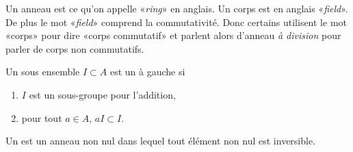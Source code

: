 \begin{remark}
    Un anneau est ce qu'on appelle «\emph{ring}» en anglais. Un corps est en anglais «\emph{field}». De plus le mot «\emph{field}» comprend la commutativité. Donc certains utilisent le mot «corps» pour dire «corps commutatif» et parlent alors d'anneau \emph{à division} pour parler de corps non commutatifs.
\end{remark}

\begin{definition}  \label{DefooQULAooREUIU}
    Un sous ensemble \( I\subset A\) est un  à gauche si
    \begin{enumerate}
        \item
            \( I\) est un sous-groupe pour l'addition,
        \item
            pour tout \( a\in A\), \( aI\subset I\).
    \end{enumerate}
\end{definition}

\begin{definition}  \label{DefTMNooKXHUd}
    Un  est un anneau non nul dans lequel tout élément non nul est inversible.
\end{definition}

